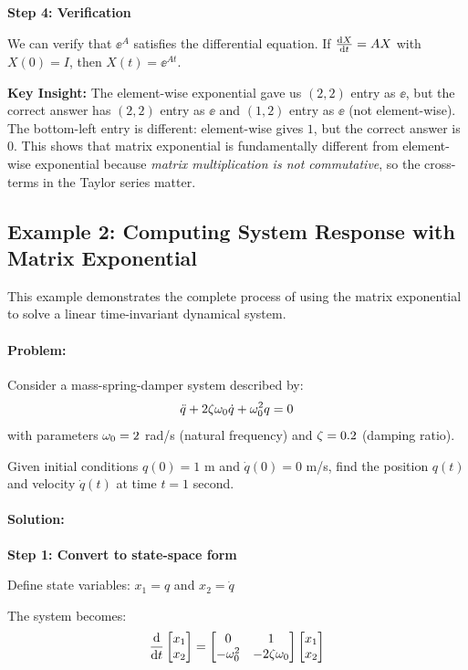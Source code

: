 \documentclass[11pt,a4paper]{article}
\begin{document}
\textbf{Step 4: Verification}

We can verify that $\ee^A$ satisfies the differential equation. If $\frac{\mathrm{d} X}{\mathrm{d} t} = AX$ with $X(0) = I$, then $X(t) = \ee^{At}$.

\textbf{Key Insight:} The element-wise exponential gave us $(2,2)$ entry as $\ee$, but the correct answer has $(2,2)$ entry as $\ee$ and $(1,2)$ entry as $\ee$ (not element-wise). The bottom-left entry is different: element-wise gives $1$, but the correct answer is $0$. This shows that matrix exponential is fundamentally different from element-wise exponential because \emph{matrix multiplication is not commutative}, so the cross-terms in the Taylor series matter.


\subsection{Example 2: Computing System Response with Matrix Exponential}

This example demonstrates the complete process of using the matrix exponential to solve a linear time-invariant dynamical system.

\paragraph{Problem:}
Consider a mass-spring-damper system described by:
\[
\ddot{q} + 2\zeta\omega_0\dot{q} + \omega_0^2 q = 0
\]
with parameters $\omega_0 = 2$ rad/s (natural frequency) and $\zeta = 0.2$ (damping ratio).

Given initial conditions $q(0) = 1$ m and $\dot{q}(0) = 0$ m/s, find the position $q(t)$ and velocity $\dot{q}(t)$ at time $t = 1$ second.

\paragraph{Solution:}

\textbf{Step 1: Convert to state-space form}

Define state variables: $x_1 = q$ and $x_2 = \dot{q}$

The system becomes:
\[
\frac{\mathrm{d} }{\mathrm{d} t}\begin{bmatrix} x_1 \\ x_2 \end{bmatrix} = \begin{bmatrix} 0 & 1 \\ -\omega_0^2 & -2\zeta\omega_0 \end{bmatrix}\begin{bmatrix} x_1 \\ x_2 \end{bmatrix}
\]
\end{document}
